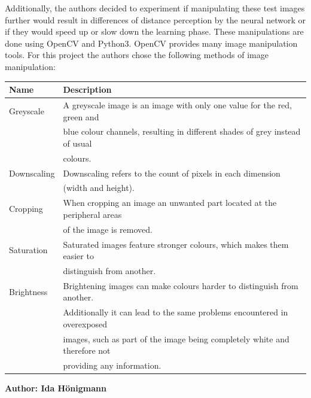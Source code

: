 Additionally, the authors decided to experiment if manipulating these test images further would result in differences of distance perception by the neural network or if they would speed up or slow down the learning phase. These manipulations are done using OpenCV and Python3. OpenCV provides many image manipulation tools. For this project the authors chose the following methods of image manipulation:

\begin{table}[h!]
	\begin{tabular}{|l|l|}
		\hline
		\bfseries Name & \bfseries Description \\
		\hline
		Greyscale & A greyscale image is an image with only one value for the red, green and \\
		& blue colour channels, resulting in different shades of grey instead of usual \\
		& colours. \\
		\hline
		Downscaling & Downscaling refers to the count of pixels in each dimension \\
		& (width and height). \\
		\hline
		Cropping & When cropping an image an unwanted part located at the peripheral areas \\
		& of the image is removed. \\
		\hline
		Saturation & Saturated images feature stronger colours, which makes them easier to \\
		& distinguish from another. \\
		\hline
		Brightness & Brightening images can make colours harder to distinguish from another. \\
		& Additionally it can lead to the same problems encountered in overexposed \\
		& images, such as part of the image being completely white and therefore not \\
		& providing any information. \\
		\hline
	\end{tabular}
\end{table}

\newpage

\vspace{5mm}
\noindent
\textbf{Author: Ida Hönigmann} 

